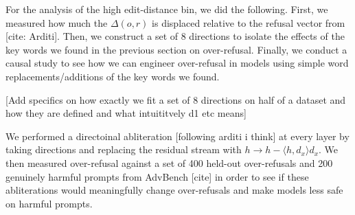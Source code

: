 \documentclass{article}
\begin{document}
For the analysis of the high edit-distance bin, we did the following. 
First, we measured how much the $\Delta(o, r)$ is displaced relative to the refusal vector from [cite: Arditi]. Then, we construct a set of 8 directions to isolate the effects of the key words we found in the previous section on over-refusal. Finally, we conduct a causal study to see how we can engineer over-refusal in models using simple word replacements/additions of the key words we found. 

[Add specifics on how exactly we fit a set of 8 directions on half of a dataset and how they are defined and what intuititvely d1 etc means]

We performed a directoinal abliteration [following arditi i think] at every layer by taking directions and replacing the residual stream with $h \rightarrow h - \langle h, d_x \rangle d_x$. We then measured over-refusal against a set of 400 held-out over-refusals and 200 genuinely harmful prompts from AdvBench [cite] in order to see if these abliterations would meaningfully change over-refusals and make models less safe on harmful prompts. 
\end{document}
